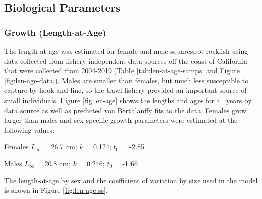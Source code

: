 \documentclass[11pt,
  english,
  a4paper,
]{article}
\begin{document}
\leavevmode\tagmcend\tagstructend\par


\hypertarget{biological-parameters}{%
\subsection{Biological Parameters}\label{biological-parameters}}

\leavevmode\tagmcend\tagstructend


\hypertarget{growth-length-at-age}{%
\subsubsection{Growth (Length-at-Age)}\label{growth-length-at-age}}

\leavevmode\tagmcend\tagstructend


The length-at-age was estimated for female and male squarespot rockfish using data collected from fishery-independent data sources off the coast of California that were collected from 2004-2019 (Table \ref{tab:len-at-age-samps} and Figure \ref{fig:len-age-data}). Males are smaller than females, but much less susceptible to capture by hook and line, so the trawl fishery provided an important source of small individuals. Figure \ref{fig:len-age} shows the lengths and ages for all years by data source as well as predicted von Bertalanffy fits to the data. Females grow larger than males and sex-specific growth parameters were estimated at the following values:

\leavevmode\tagmcend\tagstructend\par

\begin{centering}

Females $L_{\infty}$ = 26.7 cm; $k$ = 0.124; $t_0$ = -2.85

Males $L_{\infty}$ = 20.8 cm; $k$ = 0.246; $t_0$ = -1.66

\end{centering}

\vspace{0.5cm}


The length-at-age by sex and the coefficient of variation by size used in the model is shown in Figure \ref{fig:len-age-ss}.
\end{document}
